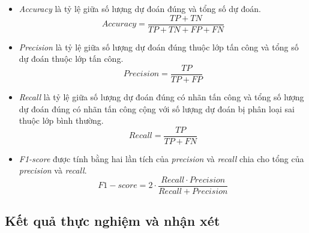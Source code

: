 \begin{itemize}
    \item \emph{Accuracy} là tỷ lệ giữa số lượng dự đoán đúng và tổng số dự đoán.
    \begin{equation} \label{eq:accuracy}
        Accuracy = \frac{TP + TN}{TP + TN + FP + FN}
    \end{equation}
    \item \emph{Precision} là tỷ lệ giữa số lượng dự đoán đúng thuộc lớp tấn công và tổng số dự đoán thuộc lớp tấn công.
    \begin{equation} \label{eq:precision}
        Precision = \frac{TP}{TP + FP}
    \end{equation}
    \item \emph{Recall} là tỷ lệ giữa số lượng dự đoán đúng có nhãn tấn công và tổng số lượng dự đoán đúng có nhãn tấn công cộng với số lượng dự đoán bị phân loại sai thuộc lớp bình thường.
    \begin{equation} \label{eq:recall}
        Recall = \frac{TP}{TP + FN}
    \end{equation}
    \item \emph{F1-score} được tính bằng hai lần tích của \emph{precision} và \emph{recall} chia cho tổng của \emph{precision} và \emph{recall}.
    \begin{equation} \label{eq:f1-score}
        F1-score = 2 \cdot \frac{Recall \cdot Precision}{Recall + Precision}
    \end{equation}
\end{itemize}

\subsection{Kết quả thực nghiệm và nhận xét} 

